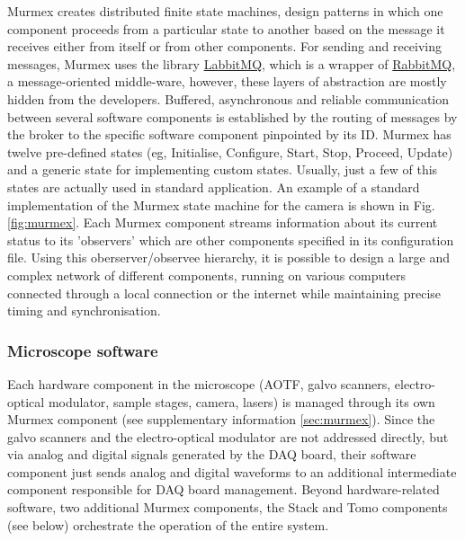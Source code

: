 \documentclass[12pt]{spieman}  %
\begin{document}
Murmex creates distributed finite state machines, design patterns in which one component proceeds from a particular state to another based on the message it receives either from itself or from other components. For sending and receiving messages, Murmex uses the library \href{http://sine.ni.com/nips/cds/view/p/lang/en/nid/211065}{LabbitMQ}, which is a wrapper of \href{http://www.rabbitmq.com/}{RabbitMQ}, a message-oriented middle-ware, however, these layers of abstraction are mostly hidden from the developers. %
Buffered, asynchronous and reliable communication between several software components is established by the routing of messages by the broker to the specific software component pinpointed by its ID. %
Murmex has twelve pre-defined states (eg, Initialise, Configure, Start, Stop, Proceed, Update) and a generic state for implementing custom states. Usually, just a few of this states are actually used in standard application. An example of a standard implementation of the Murmex state machine for the camera is shown in Fig. \ref{fig:murmex}. Each Murmex component streams information about its current status to its 'observers' which are other components specified in its configuration file. Using this oberserver/observee hierarchy, it is possible to design a large and complex network of different components, running on various computers connected through a local connection or the internet while maintaining precise timing and synchronisation. %

\subsubsection{Microscope software}
Each hardware component in the microscope (AOTF, galvo scanners, electro-optical modulator, sample stages, camera, lasers) is managed through its own Murmex component (see supplementary information \ref{sec:murmex}). Since the galvo scanners and the electro-optical modulator are not addressed directly, but via analog and digital signals generated by the DAQ board, their software component just sends analog and digital waveforms to an additional intermediate component responsible for DAQ board management. Beyond hardware-related software, two additional Murmex components, the Stack and Tomo components (see below) orchestrate the operation of the entire system. 
\end{document}
